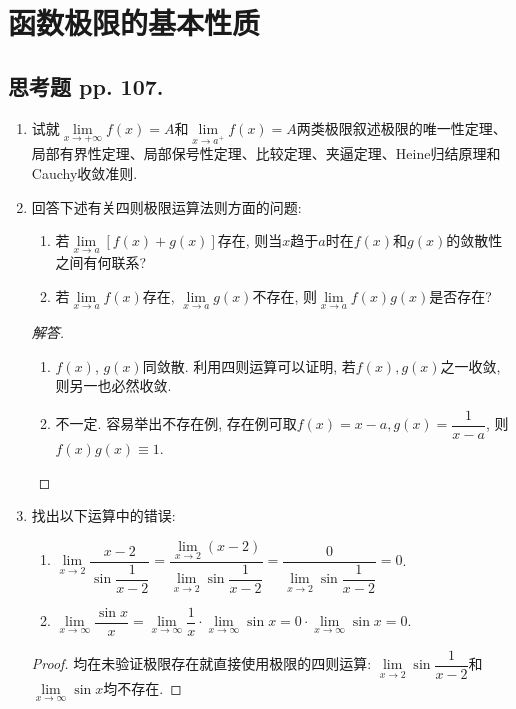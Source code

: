 \documentclass[a4paper,11pt,twoside]{ctexbook}
\begin{document}
\section{函数极限的基本性质}
\subsection{思考题 pp. 107.}
\begin{enumerate}
	\item 试就$\lim\limits_{x\to+\infty} f(x)=A$和$\lim\limits_{x\to a^{+}} f(x)=A$两类极限叙述极限的唯一性定理、局部有界性定理、局部保号性定理、比较定理、夹逼定理、Heine归结原理和Cauchy收敛准则.

	\item 回答下述有关四则极限运算法则方面的问题:
	      \begin{enumerate}[(1)]
		      \item 若$\lim\limits_{x\to a} [f(x)+g(x)]$存在, 则当$x$趋于$a$时在$f(x)$和$g(x)$的敛散性之间有何联系?
		      \item 若$\lim\limits_{x\to a} f(x)$存在, $\lim\limits_{x\to a} g(x)$不存在, 则$\lim\limits_{x\to a} f(x)g(x)$是否存在?
	      \end{enumerate}
	      \begin{proof}[解答]
		      \begin{enumerate}[(1)]
			      \item $f(x)$, $g(x)$同敛散. 利用四则运算可以证明, 若$f(x),g(x)$之一收敛, 则另一也必然收敛.
			      \item 不一定. 容易举出不存在例, 存在例可取$f(x)=x-a, g(x)=\dfrac{1}{x-a}$, 则$f(x)g(x)\equiv 1$. \qedhere
		      \end{enumerate}
	      \end{proof}

	\item 找出以下运算中的错误:
	      \begin{enumerate}[(1)]
		      \item $\lim\limits_{x\to 2} \dfrac{x-2}{\sin{\dfrac{1}{x-2}}}=\dfrac{\lim\limits_{x\to 2} (x-2)}{\lim\limits_{x\to 2} \sin{\dfrac{1}{x-2}}}=\dfrac{0}{\lim\limits_{x\to 2}\sin{\dfrac{1}{x-2}}}=0$.
		      \item $\lim\limits_{x\to\infty}\dfrac{\sin{x}}{x}=\lim\limits_{x\to\infty} \dfrac{1}{x}\cdot \lim\limits_{x\to\infty} \sin{x} =0\cdot\lim\limits_{x\to\infty} \sin{x}=0$.
	      \end{enumerate}
	      \begin{proof}
		      均在未验证极限存在就直接使用极限的四则运算: $\lim\limits_{x\to 2}\sin{\dfrac{1}{x-2}}$和$\lim\limits_{x\to\infty} \sin{x}$均不存在. \qedhere
	      \end{proof}


\end{enumerate}
\end{document}
